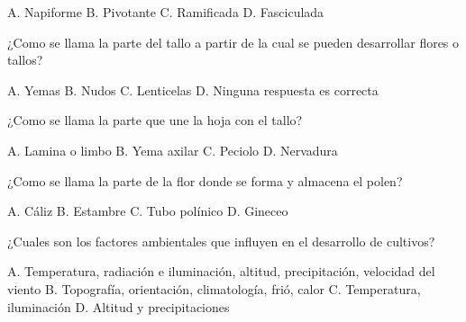 \documentclass[11pt]{exam}
\begin{document}
{\begin{questions}
\begin{figure}[h!]
  \end{figure}
  \begin{checkboxes}
    \choice A. Napiforme
    \choice B. Pivotante
    \choice C. Ramificada
    \CorrectChoice D. Fasciculada
  \end{checkboxes}
\question ¿Como se llama la parte del tallo a partir de la cual se pueden
  desarrollar flores o tallos?
  \begin{checkboxes}
    \CorrectChoice A. Yemas
    \choice B. Nudos
    \choice C. Lenticelas
    \choice D. Ninguna respuesta es correcta
  \end{checkboxes}
\question ¿Como se llama la parte que une la hoja con el tallo?
  \begin{checkboxes}
    \choice A. Lamina o limbo
    \choice B. Yema axilar
    \CorrectChoice C. Peciolo
    \choice D. Nervadura
  \end{checkboxes}
\question ¿Como se llama la parte de la flor donde se forma y almacena el polen?
  \begin{checkboxes}
    \choice A. Cáliz
    \CorrectChoice B. Estambre
    \choice C. Tubo polínico
    \choice D. Gineceo
  \end{checkboxes}
\question ¿Cuales son los factores ambientales que influyen en el desarrollo de
  cultivos?
  \begin{checkboxes}
    \CorrectChoice A. Temperatura, radiación e iluminación, altitud, precipitación,
    velocidad del viento
    \choice B. Topografía, orientación, climatología, frió, calor
    \choice C. Temperatura, iluminación
    \choice D. Altitud y precipitaciones
  \end{checkboxes}
\end{questions}

}
\end{document}
